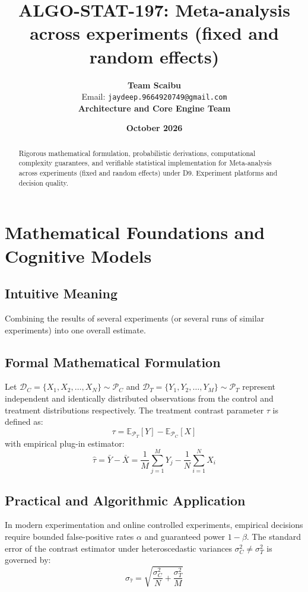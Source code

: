 \documentclass[11pt,a4paper]{article}
\title{\textbf{ALGO-STAT-197: Meta-analysis across experiments (fixed and random effects)}}
\author{\textbf{Team Scaibu} \\ \small Email: \texttt{jaydeep.9664920749@gmail.com} \\ \small \textbf{Architecture and Core Engine Team}}
\date{\textbf{October 2026}}
\theoremstyle{definition}
\begin{document}
\maketitle

\begin{abstract}
Rigorous mathematical formulation, probabilistic derivations, computational complexity guarantees, and verifiable statistical implementation for Meta-analysis across experiments (fixed and random effects) under D9. Experiment platforms and decision quality.
\end{abstract}

\section{Mathematical Foundations and Cognitive Models}

\subsection{Intuitive Meaning}
Combining the results of several experiments (or several runs of similar experiments) into one overall estimate.

\subsection{Formal Mathematical Formulation}
Let $\mathcal{D}_C = \{X_1, X_2, \dots, X_N\} \sim \mathcal{P}_C$ and $\mathcal{D}_T = \{Y_1, Y_2, \dots, Y_M\} \sim \mathcal{P}_T$ represent independent and identically distributed observations from the control and treatment distributions respectively.
The treatment contrast parameter $\tau$ is defined as:
\begin{equation}
\tau = \mathbb{E}_{\mathcal{P}_T}[Y] - \mathbb{E}_{\mathcal{P}_C}[X]
\end{equation}
with empirical plug-in estimator:
\begin{equation}
\hat{\tau} = \bar{Y} - \bar{X} = \frac{1}{M} \sum_{j=1}^M Y_j - \frac{1}{N} \sum_{i=1}^N X_i
\end{equation}

\subsection{Practical and Algorithmic Application}
In modern experimentation and online controlled experiments, empirical decisions require bounded false-positive rates $\alpha$ and guaranteed power $1 - \beta$.
The standard error of the contrast estimator under heteroscedastic variances $\sigma_C^2 \neq \sigma_T^2$ is governed by:
\begin{equation}
\sigma_{\hat{\tau}} = \sqrt{\frac{\sigma_C^2}{N} + \frac{\sigma_T^2}{M}}
\end{equation}
\end{document}
